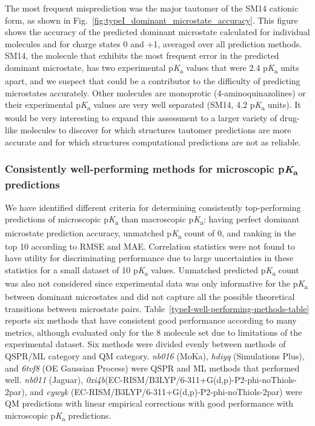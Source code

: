\documentclass[9pt,lineno,final]{elife}
\newcommand{\pKa}{p\textit{K}\textsubscript{a}}
\begin{document}
The most frequent misprediction was the major tautomer of the SM14 cationic form, as shown in Fig.~\ref{fig:typeI_dominant_microstate_accuracy}. 
This figure shows the accuracy of the predicted dominant microstate calculated for individual molecules and for charge states 0 and +1, averaged over all prediction methods. 
SM14, the molecule that exhibits the most frequent error in the predicted dominant microstate, has two experimental \pKa{} values that were 2.4 \pKa{} units apart, and we suspect that could be a contributor to the difficulty of predicting microstates accurately. 
Other molecules are monoprotic (4-aminoquinazolines) or their experimental \pKa{} values are very well separated (SM14, 4.2 \pKa{} units). 
It would be very interesting to expand this assessment to a larger variety of drug-like molecules to discover for which structures tautomer predictions are more accurate and for which structures computational predictions are not as reliable.


\subsubsection{Consistently well-performing methods for microscopic \pKa{} predictions}

We have identified different criteria for determining consistently top-performing predictions of microscopic \pKa{} than macroscopic \pKa{}: having perfect dominant microstate prediction accuracy, unmatched \pKa{} count of 0, and ranking in the top 10 according to RMSE and MAE. 
Correlation statistics were not found to have utility for discriminating performance due to large uncertainties in these statistics for a small dataset of 10 \pKa{} values. 
Unmatched predicted \pKa{} count was also not considered since experimental data was only informative for the \pKa{} between dominant microstates and did not capture all the possible theoretical transitions between microstate pairs. 
Table~\ref{typeI-well-performing-methods-table} reports six methods that have consistent good performance according to many metrics, although evaluated only for the 8 molecule set due to limitations of the experimental dataset. 
Six methods were divided evenly between methods of QSPR/ML category and QM category. 
\textit{nb016} (MoKa), \textit{hdiyq} (Simulations Plus), and \textit{6tvf8} (OE Gaussian Process) were QSPR and ML methods that performed well. 
\textit{nb011} (Jaguar), \textit{0xi4b}(EC-RISM/B3LYP/6-311+G(d,p)-P2-phi-noThiols-2par), and \textit{cywyk} (EC-RISM/B3LYP/6-311+G(d,p)-P2-phi-noThiols-2par) were QM predictions with linear empirical corrections with good performance with microscopic \pKa{} predictions. 
\end{document}
